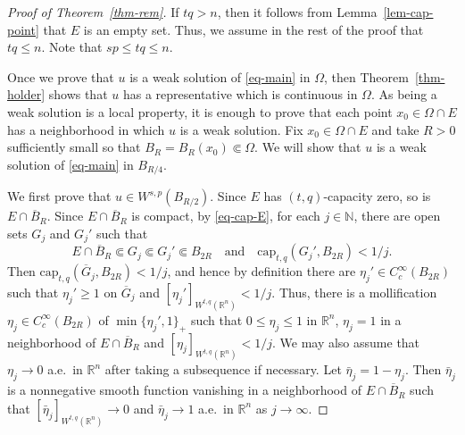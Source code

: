 \documentclass[11pt]{amsart}
\theoremstyle{plain}
\theoremstyle{definition}
\numberwithin{equation}{section}
\begin{document}
\begin{proof}[Proof of Theorem~\ref{thm-rem}]
If $tq>n$, then it follows from Lemma~\ref{lem-cap-point} that $E$ is an empty set. Thus, we assume in the rest of the proof that $tq \leq n$. Note that $sp \leq tq \leq n$.

Once we prove that $u$ is a weak solution of \eqref{eq-main} in $\Omega$, then Theorem~\ref{thm-holder} shows that $u$ has a representative which is continuous in $\Omega$. As being a weak solution is a local property, it is enough to prove that each point $x_0 \in \Omega \cap E$ has a neighborhood in which $u$ is a weak solution. Fix $x_0 \in \Omega \cap E$ and take $R>0$ sufficiently small so that $B_{R}=B_{R}(x_0) \Subset \Omega$. We will show that $u$ is a weak solution of \eqref{eq-main} in $B_{R/4}$.

We first prove that $u \in W^{s, p}(B_{R/2})$. Since $E$ has $(t, q)$-capacity zero, so is $E \cap \overline{B}_R$. Since $E \cap \overline{B}_R$ is compact, by \eqref{eq-cap-E}, for each $j\in \mathbb{N}$, there are open sets $G_j$ and $G_j'$ such that
\begin{equation*}
E \cap \overline{B}_R \Subset G_j \Subset G_j' \Subset B_{2R} \quad\text{and}\quad \mathrm{cap}_{t, q}(G_j', B_{2R}) < 1/j.
\end{equation*}
Then $\mathrm{cap}_{t, q}(\overline{G}_j, B_{2R})<1/j$, and hence by definition there are $\eta_j' \in C^\infty_c(B_{2R})$ such that $\eta_j' \geq 1$ on $\overline{G}_j$ and $[\eta_j']_{W^{t, q}(\mathbb{R}^n)}<1/j$. Thus, there is a mollification $\eta_j \in C^\infty_c(B_{2R})$ of $\min\{\eta_j', 1\}_+$ such that $0 \leq \eta_j \leq 1$ in $\mathbb{R}^n$, $\eta_j=1$ in a neighborhood of $E \cap \overline{B}_R$ and $[\eta_j]_{W^{t, q}(\mathbb{R}^n)}<1/j$. We may also assume that $\eta_j \to 0$ a.e.\ in $\mathbb{R}^n$ after taking a subsequence if necessary. Let $\bar{\eta}_j=1-\eta_j$. Then $\bar{\eta}_j$ is a nonnegative smooth function vanishing in a neighborhood of $E \cap \overline{B}_R$ such that $[\bar{\eta}_j]_{W^{t, q}(\mathbb{R}^n)} \to 0$ and $\bar{\eta}_j \to 1$ a.e.\ in $\mathbb{R}^n$ as $j \to \infty$.


\end{proof}
\end{document}
